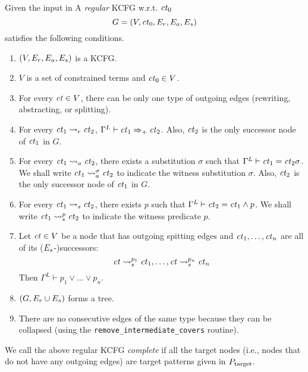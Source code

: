 \documentclass{article}
\begin{document}
\begin{definition}
Given the input in 
A \emph{regular}
KCFG w.r.t. $\mathit{ct}_0$ 
\[G = (V, \mathit{ct}_0, E_r, E_a, E_s)\] 
satisfies the following conditions.
\begin{enumerate}
\item $(V, E_r, E_a, E_s)$ is a KCFG.
\item $V$ is a set of constrained terms and $\mathit{ct}_0 \in V$.
\item For every $\mathit{ct} \in V$, there can be only one type of outgoing edges
   (rewriting, abstracting, or splitting). 
\item For every $\mathit{ct}_1 \rightsquigarrow_r \mathit{ct}_2$, $\Gamma^L \vdash \mathit{ct}_1 \Rightarrow_+ \mathit{ct}_2$.
   Also, $\mathit{ct}_2$ is the only successor node of $\mathit{ct}_1$ in $G$.
\item For every $\mathit{ct}_1 \rightsquigarrow_a \mathit{ct}_2$, there exists a substitution $\sigma$ such that $\Gamma^L \vdash \mathit{ct}_1 = \mathit{ct}_2\sigma$.
   We shall write $\mathit{ct}_1 \rightsquigarrow_a^\sigma \mathit{ct}_2$ to indicate the witness substitution $\sigma$. 
   Also, $\mathit{ct}_2$ is the only successor node of $\mathit{ct}_1$ in $G$. 
\item For every $\mathit{ct}_1 \rightsquigarrow_s \mathit{ct}_2$, there exists
$p$ such that $\Gamma^L \vdash \mathit{ct}_2 = \mathit{ct}_1 \land p$. 
      We shall write $\mathit{ct}_1 \rightsquigarrow_s^p \mathit{ct}_2$ to indicate the witness predicate $p$.
\item Let $\mathit{ct} \in V$ be a node that has outgoing spitting edges
and $\mathit{ct}_1,\dots,\mathit{ct}_n$ are all of its ($E_s$-)successors:
\[\mathit{ct}\rightsquigarrow_s^{p_1} \mathit{ct}_1 , \dots , \mathit{ct} \rightsquigarrow_s^{p_n} \mathit{ct}_n\]
 Then $\Gamma^L \vdash p_1 \lor \dots \lor p_n$. 
\item $(G, E_r \cup E_s)$ forms a tree. 
\item There are no consecutive edges of the same type because they can be collapsed (using the \verb|remove_intermediate_covers| routine). 
\end{enumerate}
We call the above regular KCFG \emph{complete} if
all the target nodes (i.e., nodes that do not have any outgoing edges) 
are target patterns given in $P_\text{target}$. 
\end{definition}
\end{document}
